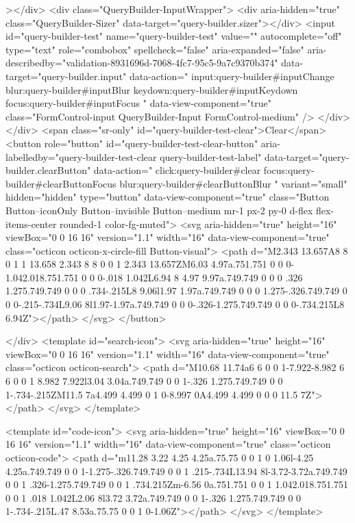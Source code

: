           ></div>
          <div class="QueryBuilder-InputWrapper">
            <div aria-hidden="true" class="QueryBuilder-Sizer" data-target="query-builder.sizer"></div>
            <input id="query-builder-test" name="query-builder-test" value="" autocomplete="off" type="text" role="combobox" spellcheck="false" aria-expanded="false" aria-describedby="validation-8931696d-7068-4fc7-95c5-9a7c9370b374" data-target="query-builder.input" data-action="
          input:query-builder#inputChange
          blur:query-builder#inputBlur
          keydown:query-builder#inputKeydown
          focus:query-builder#inputFocus
        " data-view-component="true" class="FormControl-input QueryBuilder-Input FormControl-medium" />
          </div>
        </div>
          <span class="sr-only" id="query-builder-test-clear">Clear</span>
          <button role="button" id="query-builder-test-clear-button" aria-labelledby="query-builder-test-clear query-builder-test-label" data-target="query-builder.clearButton" data-action="
                click:query-builder#clear
                focus:query-builder#clearButtonFocus
                blur:query-builder#clearButtonBlur
              " variant="small" hidden="hidden" type="button" data-view-component="true" class="Button Button--iconOnly Button--invisible Button--medium mr-1 px-2 py-0 d-flex flex-items-center rounded-1 color-fg-muted">  <svg aria-hidden="true" height="16" viewBox="0 0 16 16" version="1.1" width="16" data-view-component="true" class="octicon octicon-x-circle-fill Button-visual">
    <path d="M2.343 13.657A8 8 0 1 1 13.658 2.343 8 8 0 0 1 2.343 13.657ZM6.03 4.97a.751.751 0 0 0-1.042.018.751.751 0 0 0-.018 1.042L6.94 8 4.97 9.97a.749.749 0 0 0 .326 1.275.749.749 0 0 0 .734-.215L8 9.06l1.97 1.97a.749.749 0 0 0 1.275-.326.749.749 0 0 0-.215-.734L9.06 8l1.97-1.97a.749.749 0 0 0-.326-1.275.749.749 0 0 0-.734.215L8 6.94Z"></path>
</svg>
</button>

      </div>
      <template id="search-icon">
  <svg aria-hidden="true" height="16" viewBox="0 0 16 16" version="1.1" width="16" data-view-component="true" class="octicon octicon-search">
    <path d="M10.68 11.74a6 6 0 0 1-7.922-8.982 6 6 0 0 1 8.982 7.922l3.04 3.04a.749.749 0 0 1-.326 1.275.749.749 0 0 1-.734-.215ZM11.5 7a4.499 4.499 0 1 0-8.997 0A4.499 4.499 0 0 0 11.5 7Z"></path>
</svg>
</template>

<template id="code-icon">
  <svg aria-hidden="true" height="16" viewBox="0 0 16 16" version="1.1" width="16" data-view-component="true" class="octicon octicon-code">
    <path d="m11.28 3.22 4.25 4.25a.75.75 0 0 1 0 1.06l-4.25 4.25a.749.749 0 0 1-1.275-.326.749.749 0 0 1 .215-.734L13.94 8l-3.72-3.72a.749.749 0 0 1 .326-1.275.749.749 0 0 1 .734.215Zm-6.56 0a.751.751 0 0 1 1.042.018.751.751 0 0 1 .018 1.042L2.06 8l3.72 3.72a.749.749 0 0 1-.326 1.275.749.749 0 0 1-.734-.215L.47 8.53a.75.75 0 0 1 0-1.06Z"></path>
</svg>
</template>

